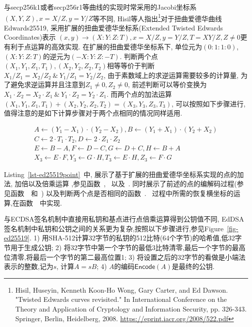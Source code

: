 与secp256k1或者secp256r1等曲线的实现时常采用的Jacobi坐标系$(X, Y, Z), x = X/Z, y = Y/Z$等不同, 
Hisil等人指出\footnote{
Hisil, Huseyin, Kenneth Koon-Ho Wong, Gary Carter, and Ed Dawson. 
"Twisted Edwards curves revisited." 
In International Conference on the Theory and Application of Cryptology and Information Security, 
pp. 326-343. Springer, Berlin, Heidelberg, 2008.
\url{https://eprint.iacr.org/2008/522.pdf}}对于扭曲爱德华曲线Edwards25519,
采用扩展的扭曲爱德华坐标系(Extended Twisted Edwards Coordinates)表示
$(x,y) \rightarrow (X : Y : Z : T), x = X/Z, y = Y/Z, T = XY/Z, Z \neq 0$更有利于点运算的高效实现.
在扩展的扭曲爱德华坐标系下, 单位元为$(0 : 1 : 1 : 0)$, $(X : Y : Z : T)$的逆元为$(-X : Y : Z : -T)$.
判断两个点$(X_1, Y_1, Z_1, T_1), (X_2, Y_2, Z_2, T_2)$相等等价于判断
$X_1/Z_1 = X_2/Z_2\ \&\ Y_1/Z_1 = Y_2/Z_2$, 由于素数域上的求逆运算需要较多的计算量,
为了避免求逆运算并且注意到$Z_1 \neq 0, Z_2 \neq 0$, 前述判断可以等价变换为
$X_1 \cdot Z_2 = X_2 \cdot Z_1\ \& \ Y_1 \cdot Z_2 = Y_2 \cdot Z_1$.
而两个点的加法运算$(X_1, Y_1, Z_1, T_1) +  (X_2, Y_2, Z_2, T_2) = (X_3, Y_3, Z_3, T_3)$,
可以按照如下步骤进行, 值得注意的是如下计算步骤对于两个点相同的情况同样适用.

\begin{equation*}
\begin{array}{c}
A \leftarrow (Y_1 - X_1) \cdot (Y_2 - X_2), B \leftarrow (Y_1 + X_1) \cdot (Y_2 + X_2) \\
C \leftarrow 2\cdot T_1 \cdot T_2, D \leftarrow 2 \cdot Z_1 \cdot Z_2 \\
E \leftarrow B - A, F \leftarrow D - C, G \leftarrow D + C, H \leftarrow B + A \\
X_3 \leftarrow E \cdot F, Y_3 \leftarrow G\cdot H, T_3 \leftarrow E \cdot H, Z_3 \leftarrow F \cdot G
\end{array}
\end{equation*}

Listing~\ref{lst-ed25519point}~中, 展示了基于扩展的扭曲爱德华坐标系实现的点的加法, 加倍以及倍乘运算
,参见函数~, ~以及~.
同时展示了前述的点的编解码过程(参见函数~~和~)
以及判断两个点是否相同的函数~.
~过程中所需的恢复横坐标的运算,在函数~~中实现.



与ECDSA签名机制中直接用私钥和基点进行点倍乘运算得到公钥值不同,
EdDSA签名机制中私钥和公钥之间的关系更为复杂,按照以下步骤进行,参见Figure~\ref{fig-ed25519}.
1) 用\textsf{SHA-512}计算32字节的私钥的512比特(64个字节)的哈希值,低32字节用于生成公钥;
2) 将32字节中第一个字节的最低3比特清零,最后一个字节的最高位清零,将最后一个字节的第二最高位置1;
3) 将设置之后的32字节的看做是小端法表示的整数,记为$s$, 计算$A = sB$;
4) $A$的编码$\textsf{Encode}(A)$是最终的公钥.

